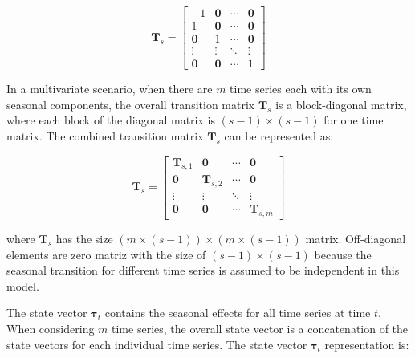     \begin{equation}
        \mathbf{T}_s=
            \left[
                \begin{array}{cccc}
                    -1             & \mathbf{0} & \cdots & \mathbf{0} \\
                    1              & \mathbf{0} & \cdots & \mathbf{0} \\
                    \mathbf{0}     & 1          & \cdots & \mathbf{0} \\
                    \vdots         & \vdots     & \ddots & \vdots     \\
                    \mathbf{0}     & \mathbf{0} & \cdots & 1
                \end{array}
            \right]
    \label{eq:seasonal_transition_uni}
    \end{equation}

    In a multivariate scenario, when there are $m$ time series each with its own seasonal components,
    the overall transition matrix $\mathbf{T}_s$ is a block-diagonal matrix, where each block of the diagonal matrix
    is $(s-1) \times (s-1)$ for one time matrix.
    The combined transition matrix $\mathbf{T}_{s}$ can be represented as:

    \begin{equation}
        \mathbf{T}_s=
            \left[
                \begin{array}{cccc}
                    \mathbf{T}_{s, 1} & \mathbf{0}        & \cdots & \mathbf{0} \\
                    \mathbf{0}        & \mathbf{T}_{s, 2} & \cdots & \mathbf{0} \\
                    \vdots            & \vdots            & \ddots & \vdots     \\
                    \mathbf{0}        & \mathbf{0}        & \cdots & \mathbf{T}_{s, m}
                \end{array}
            \right]
        \label{eq:seasonal_transition_mv}
    \end{equation}

    where $\mathbf{T}_{s}$ has the size $(m \times (s-1)) \times (m \times (s-1))$ matrix.
    Off-diagonal elements are zero matriz with the size of $(s-1) \times (s-1)$ because
    the seasonal transition for different time series is assumed to be independent in this model.

    The state vector $\bm{\tau}_t$ contains the seasonal effects for all time series at time $t$.
    When considering $m$ time series, the overall state vector is a concatenation of the state vectors for each
    individual time series. The state vector $\bm{\tau}_t$ representation is:

